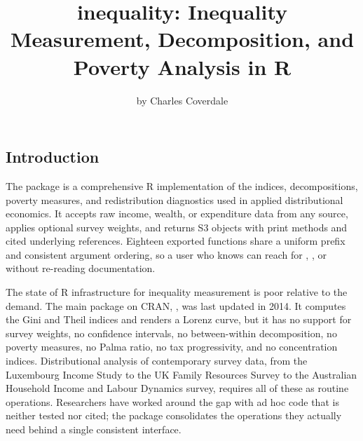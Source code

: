 \title{inequality: Inequality Measurement, Decomposition, and Poverty
Analysis in R}
\author{by Charles Coverdale}

\maketitle


\subsection{Introduction}\label{introduction}

The  package is a comprehensive R implementation of
the indices, decompositions, poverty measures, and redistribution
diagnostics used in applied distributional economics. It accepts raw
income, wealth, or expenditure data from any source, applies optional
survey weights, and returns S3 objects with print methods and cited
underlying references. Eighteen exported functions share a uniform
 prefix and consistent argument ordering, so a user who knows
 can reach for ,
, or  without re-reading
documentation.

The state of R infrastructure for inequality measurement is poor
relative to the demand. The main package on CRAN, , was
last updated in 2014. It computes the Gini and Theil indices and renders
a Lorenz curve, but it has no support for survey weights, no confidence
intervals, no between-within decomposition, no poverty measures, no
Palma ratio, no tax progressivity, and no concentration indices.
Distributional analysis of contemporary survey data, from the Luxembourg
Income Study to the UK Family Resources Survey to the Australian
Household Income and Labour Dynamics survey, requires all of these as
routine operations. Researchers have worked around the gap with ad hoc
code that is neither tested nor cited; the  package
consolidates the operations they actually need behind a single
consistent interface.

